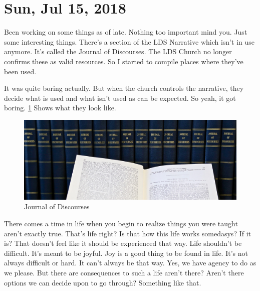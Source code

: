 \section{Sun, Jul 15, 2018}

Been working on some things as of late. Nothing too
important mind you. Just some interesting things. There's
a section of the LDS Narrative which isn't in use anymore.
It's called the Journal of Discourses. The LDS Church no
longer confirms these as valid resources. So I started to
compile places where they've been used.

It was quite boring actually. But when the church controls
the narrative, they decide what is used and what isn't used as
can be expected. So yeah, it got boring. \ref{fig:jod} Shows
what they look like.

\begin{figure}[h!]
  \centering
  \includegraphics[width=1.0\linewidth]{2018/images/jod.jpg}
  \caption{Journal of Discourses}
  \label{fig:jod}
\end{figure}

There comes a time in life when you begin to realize things you 
were taught aren't exactly true. That's life right? Is that how
this life works somedasys? If it is? That doesn't feel like it
should be experienced that way. Life shouldn't be difficult. It's
meant to be joyful. Joy is a good thing to be found in life. It's
not always difficult or hard. It can't always be that way. Yes,
we have agency to do as we please. But there are consequences to
such a life aren't there? Aren't there options we can decide upon
to go through? Something like that.
